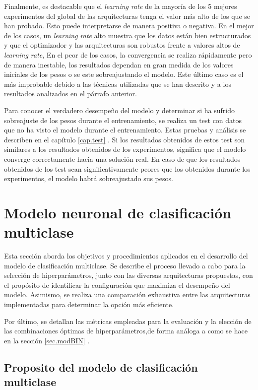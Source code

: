 Finalmente, es destacable que el \textit{learning rate} de la mayoría de los 5 mejores experimentos del global de las arquitecturas tenga el valor más alto de los que se han probado. Esto puede interpretarse de manera positiva o negativa.
En el mejor de los casos, un \textit{learning rate} alto muestra que los datos están bien estructurados y que el optimizador y las arquitecturas son robustos frente a valores altos de \textit{learning rate},
En el peor de los casos, la convergencia se realiza rápidamente pero de manera inestable, los resultados dependan en gran medida de los valores iniciales de los pesos o se este sobreajustando el modelo. Este último caso es el más improbable debido a las técnicas utilizadas que se han descrito y a los resultados analizados en el párrafo anterior.

Para conocer el verdadero desempeño del modelo y determinar si ha sufrido sobreajuste de los pesos durante el entrenamiento, se realiza un test con datos que no ha visto el modelo durante el entrenamiento. Estas pruebas y análisis se describen en el capítulo \ref{cap.test} . Si los resultados obtenidos de estos test son similares a los resultados obtenidos de los experimentos, significa que el modelo converge correctamente hacia una solución real. En caso de que los resultados obtenidos de los test sean significativamente peores que los obtenidos durante los experimentos, el modelo habrá sobreajustado sus pesos. 

\section{Modelo neuronal de clasificación multiclase}
Esta sección aborda los objetivos y procedimientos aplicados en el desarrollo del modelo de clasificación multiclase. Se describe el proceso llevado a cabo para la selección de hiperparámetros, junto con las diversas arquitecturas propuestas, con el propósito de identificar la configuración que maximiza el desempeño del modelo. Asimismo, se realiza una comparación exhaustiva entre las arquitecturas implementadas para determinar la opción más eficiente.

Por último, se detallan las métricas empleadas para la evaluación y la elección de las combinaciones óptimas de hiperparámetros,de forma análoga a como se hace en la sección \ref{sec.modBIN} .

\subsection{Proposito del modelo de clasificación multiclase}

